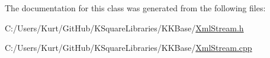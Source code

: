The documentation for this class was generated from the following files\+:\begin{DoxyCompactItemize}
\item 
C\+:/\+Users/\+Kurt/\+Git\+Hub/\+K\+Square\+Libraries/\+K\+K\+Base/\hyperlink{_xml_stream_8h}{Xml\+Stream.\+h}\item 
C\+:/\+Users/\+Kurt/\+Git\+Hub/\+K\+Square\+Libraries/\+K\+K\+Base/\hyperlink{_xml_stream_8cpp}{Xml\+Stream.\+cpp}\end{DoxyCompactItemize}
